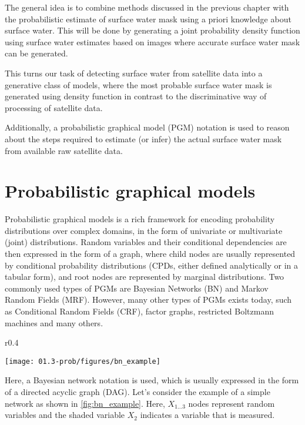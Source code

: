 The general idea is to combine methods discussed in the previous chapter with the probabilistic estimate of surface water mask using a priori knowledge about surface water. This will be done by generating a joint probability density function using surface water estimates based on images where accurate surface water mask can be generated. 

This turns our task of detecting surface water from satellite data into a generative class of models, where the most probable surface water mask is generated using density function in contrast to the discriminative way of processing of satellite data. 

Additionally, a probabilistic graphical model (PGM) notation is used to reason about the steps required to estimate (or infer) the actual surface water mask from available raw satellite data.

\section{Probabilistic graphical models}

Probabilistic graphical models \cite{koller2009probabilistic} is a rich framework for encoding probability distributions over complex domains, in the form of univariate or multivariate (joint) distributions. Random variables and their conditional dependencies are then expressed in the form of a graph, where child nodes are usually represented by conditional probability distributions (CPDs, either defined analytically or in a tabular form), and root nodes are represented by marginal distributions. Two commonly used types of PGMs are Bayesian Networks (BN) and Markov Random Fields (MRF). However, many other types of PGMs exists today, such as Conditional Random Fields (CRF), factor graphs, restricted Boltzmann machines and many others.

\begin{wrapfigure}{r}{0.4\textwidth}
	\begin{center}
		\texttt{[image: 01.3-prob/figures/bn\_example]} 
	\end{center}
	\caption{A simple Bayesian network.}
	\label{fig:bn_example}
\end{wrapfigure}

Here, a Bayesian network notation is used, which is usually expressed in the form of a directed acyclic graph (DAG). Let's consider the example of a simple network as shown in \ref{fig:bn_example}. Here, $X_{1...3}$ nodes represent random variables and the shaded variable $X_2$ indicates a variable that is measured. 

